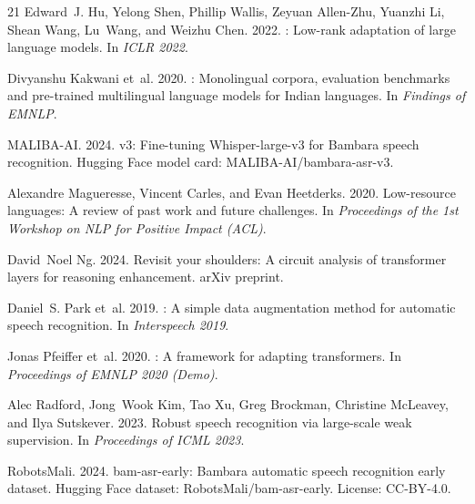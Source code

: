 \documentclass[11pt]{article}
\begin{document}
\begin{thebibliography}{21}
Edward~J. Hu, Yelong Shen, Phillip Wallis, Zeyuan Allen-Zhu, Yuanzhi Li, Shean Wang, Lu~Wang, and Weizhu Chen. 2022.
: Low-rank adaptation of large language models.
\newblock In \emph{ICLR 2022}.

Divyanshu Kakwani et~al. 2020.
: Monolingual corpora, evaluation benchmarks and pre-trained multilingual language models for {Indian} languages.
\newblock In \emph{Findings of EMNLP}.

{MALIBA-AI}. 2024.
 v3: Fine-tuning {Whisper}-large-v3 for {Bambara} speech recognition.
\newblock Hugging Face model card: MALIBA-AI/bambara-asr-v3.

Alexandre Magueresse, Vincent Carles, and Evan Heetderks. 2020.
\newblock Low-resource languages: A review of past work and future challenges.
\newblock In \emph{Proceedings of the 1st Workshop on NLP for Positive Impact (ACL)}.

David~Noel Ng. 2024.
\newblock Revisit your shoulders: A circuit analysis of transformer layers for reasoning enhancement.
\newblock arXiv preprint.

Daniel~S. Park et~al. 2019.
: A simple data augmentation method for automatic speech recognition.
\newblock In \emph{Interspeech 2019}.

Jonas Pfeiffer et~al. 2020.
: A framework for adapting transformers.
\newblock In \emph{Proceedings of EMNLP 2020 (Demo)}.

Alec Radford, Jong~Wook Kim, Tao Xu, Greg Brockman, Christine McLeavey, and Ilya Sutskever. 2023.
\newblock Robust speech recognition via large-scale weak supervision.
\newblock In \emph{Proceedings of ICML 2023}.

{RobotsMali}. 2024.
\newblock bam-asr-early: {Bambara} automatic speech recognition early dataset.
\newblock Hugging Face dataset: RobotsMali/bam-asr-early. License: CC-BY-4.0.


\end{thebibliography}
\end{document}
